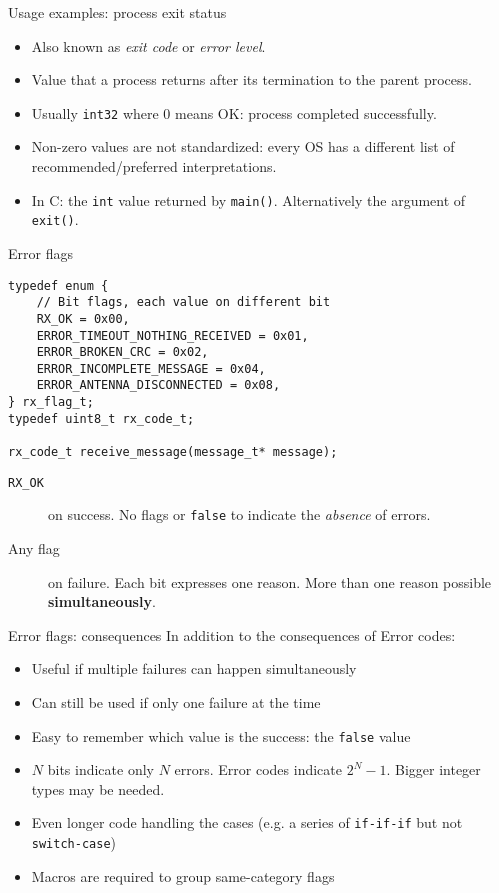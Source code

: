 \documentclass[aspectratio=169,14pt]{beamer}
\begin{document}
\begin{frame}{Usage examples: process exit status}
\begin{itemize}
    \item Also known as \textit{exit code} or \textit{error level}.
    \item Value that a process returns after its termination to the parent process.
    \item Usually \texttt{int32} where 0 means OK: process completed successfully.
    \item Non-zero values are not standardized: every OS has a different list of recommended/preferred interpretations.
    \item In C: the \texttt{int} value returned by \texttt{main()}. Alternatively the argument of \texttt{exit()}.
\end{itemize}
\end{frame}



\begin{frame}[fragile]{Error flags}
\begin{lstlisting}[style=cstyle]
typedef enum {
    // Bit flags, each value on different bit
    RX_OK = 0x00,
    ERROR_TIMEOUT_NOTHING_RECEIVED = 0x01,
    ERROR_BROKEN_CRC = 0x02,
    ERROR_INCOMPLETE_MESSAGE = 0x04,
    ERROR_ANTENNA_DISCONNECTED = 0x08,
} rx_flag_t;
typedef uint8_t rx_code_t;

rx_code_t receive_message(message_t* message);
\end{lstlisting}

\begin{description}
    \item[\texttt{RX\_OK}] on success. No flags or \texttt{false} to indicate the \textit{absence} of errors.
    \item[Any flag] on failure. Each bit expresses one reason. More than one reason possible \textbf{simultaneously}.
\end{description}
\end{frame}



\begin{frame}[fragile]{Error flags: consequences}
In addition to the consequences of Error codes:

\begin{itemize}
    \item[\good] Useful if multiple failures can happen simultaneously
    \item[\good] Can still be used if only one failure at the time
    \item[\good] Easy to remember which value is the success: the \texttt{false} value
    \item[\bad] \(N\) bits indicate only \(N\) errors. Error codes indicate \(2^N - 1\). Bigger integer types may be needed.
    \item[\bad] Even longer code handling the cases (e.g. a series of \texttt{if-if-if} but not \texttt{switch-case})
    \item[\bad] Macros are required to group same-category flags
\end{itemize}
\end{frame}
\end{document}
